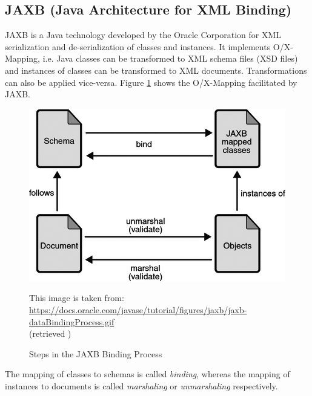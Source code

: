 \subsection{JAXB (Java Architecture for XML Binding)}
\label{subsection:JAXB}
\Gls{JAXB} \cite{JAXB} \cite{JAXBTutorial}
is a \gls{Java} technology developed by the Oracle Corporation for \gls{XML} serialization and de-serialization of classes and instances.
It implements \gls{O/X-Mapping}, i.e. \gls{Java} classes can be transformed to \gls{XML} schema files (\gls{XSD} files) and instances of classes can be transformed to \gls{XML} documents.
Transformations can also be applied vice-versa.
Figure \ref{figure:JAXBDataBindingProcess} shows the \gls{O/X-Mapping} facilitated by \gls{JAXB}.
\begin{figure}[h!]
\begin{center}
\includegraphics[width=\textwidth]{images/jaxb-dataBindingProcess_gray.png}
\end{center}
{
\scriptsize
\begin{center}
This image is taken from:\\
\url{https://docs.oracle.com/javase/tutorial/figures/jaxb/jaxb-dataBindingProcess.gif}\\
(retrieved )
\end{center}
}
\caption{Steps in the JAXB Binding Process \cite{jaxbDataBindingProcess}}
\label{figure:JAXBDataBindingProcess}
\end{figure}
The mapping of classes to schemas is called \textit{binding}, whereas the mapping of instances to documents is called \textit{marshaling} or \textit{unmarshaling} respectively.

